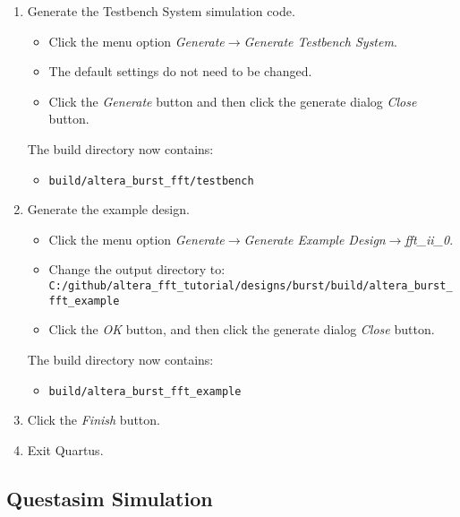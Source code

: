\begin{enumerate}
\item Generate the Testbench System simulation code.
%
\begin{itemize}
\item Click the menu option \emph{Generate}$\rightarrow$\emph{Generate
Testbench System}.
\item The default settings do not need to be changed.
\item Click the \emph{Generate} button and then click the
generate dialog \emph{Close} button.
\end{itemize}
%
The build directory now contains:
\begin{itemize}
\item \texttt{build/altera\_burst\_fft/testbench}
\end{itemize}

\item Generate the example design.
%
\begin{itemize}
\item Click the menu option \emph{Generate}$\rightarrow$\emph{Generate
Example Design}$\rightarrow$\emph{fft\_ii\_0}.
\item Change the output directory to:\\
\texttt{C:/github/altera\_fft\_tutorial/designs/burst/build/altera\_burst\_fft\_example}
\item Click the \emph{OK} button, and then click the
generate dialog \emph{Close} button.
\end{itemize}
%
The build directory now contains:
\begin{itemize}
\item \texttt{build/altera\_burst\_fft\_example}
\end{itemize}

%
\item Click the \emph{Finish} button.
\item Exit Quartus.
\end{enumerate}

\clearpage
\subsection{Questasim Simulation}

